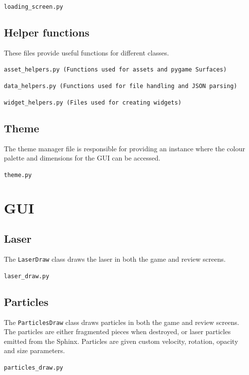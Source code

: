 \documentclass[../main/main.tex]{subfiles}
\begin{document}
\noindent\verb|loading_screen.py|


\subsection{Helper functions}
These files provide useful functions for different classes.

\label{sec:asset-helpers}
\noindent\verb|asset_helpers.py (Functions used for assets and pygame Surfaces)|


\bigskip
\label{sec:data-helpers}
\noindent\verb|data_helpers.py (Functions used for file handling and JSON parsing)|


\bigskip
\noindent\verb|widget_helpers.py (Files used for creating widgets)|


\subsection{Theme}
\label{sec:theme}
The theme manager file is responsible for providing an instance where the colour palette and dimensions for the GUI can be accessed.

\noindent\verb|theme.py|


\section{GUI}
\subsection{Laser}
The \lstinline{LaserDraw} class draws the laser in both the game and review screens.

\noindent\verb|laser_draw.py|


\subsection{Particles}
The \lstinline{ParticlesDraw} class draws particles in both the game and review screens. The particles are either fragmented pieces when destroyed, or laser particles emitted from the Sphinx. Particles are given custom velocity, rotation, opacity and size parameters.

\noindent\verb|particles_draw.py|

\end{document}
